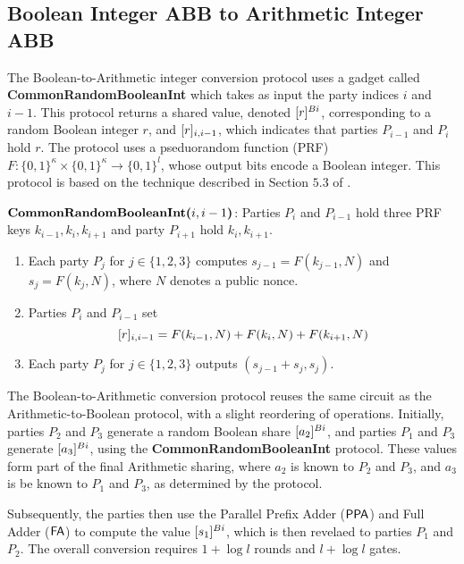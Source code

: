 \subsection{Boolean Integer ABB to Arithmetic Integer ABB}

The Boolean-to-Arithmetic integer conversion protocol uses a gadget called {\bf CommonRandomBooleanInt} which takes as input the party indices $i$ and $i - 1$.
This protocol returns a shared value, denoted $[r]^{Bi}$, corresponding to a random Boolean integer $r$, and $[r]_{i,i - 1}$, which indicates that parties $P_{i - 1}$ and $P_i$ hold $r$.
The protocol uses a pseduorandom function (PRF) $F: \{0, 1\}^\kappa \times \{0, 1\}^\kappa \rightarrow \{0, 1\}^l$, whose output bits encode a Boolean integer. 
This protocol is based on the technique described in Section $5.3$ of \cite{CCS:MohRin18}.

\begin{protocol}
	$\textbf{CommonRandomBooleanInt(}i, i - 1\textbf{)}$:
    Parties $P_i$ and $P_{i - 1}$ hold three PRF keys $k_{i - 1}, k_i, k_{i + 1}$ and party $P_{i + 1}$ hold $k_i, k_{i + 1}$.
	\begin{enumerate}
        \item Each party $P_j$ for $j \in \{1, 2, 3\}$ computes $s_{j - 1} = F(k_{j - 1}, N)$ and $s_j = F(k_j, N)$, where $N$ denotes a public nonce.
        \item Parties $P_i$ and $P_{i - 1}$ set $$[r]_{i,i - 1} = F(k_{i - 1}, N) + F(k_{i}, N) + F(k_{i + 1}, N)$$
        \item Each party $P_j$ for $j \in \{1, 2, 3\}$ outputs $(s_{j - 1} + s_j, s_j)$.
	\end{enumerate}
\end{protocol}

The Boolean-to-Arithmetic conversion protocol reuses the same circuit as the Arithmetic-to-Boolean protocol, with a slight reordering of operations.
Initially, parties $P_2$ and $P_3$ generate a random Boolean share $[a_2]^{Bi}$, and parties $P_1$ and $P_3$ generate $[a_3]^{Bi}$, using the {\bf CommonRandomBooleanInt} protocol.
These values form part of the final Arithmetic sharing, where $a_2$ is known to $P_2$ and $P_3$, and $a_3$ is be known to $P_1$ and $P_3$, as determined by the protocol.

Subsequently, the parties then use the Parallel Prefix Adder ($\mathsf{PPA}$) and Full Adder ($\mathsf{FA}$) to compute the value $[s_1]^{Bi}$, which is then revelaed to parties $P_1$ and $P_2$.
The overall conversion requires $1 + \log l$ rounds and $l + \log l$ gates.

